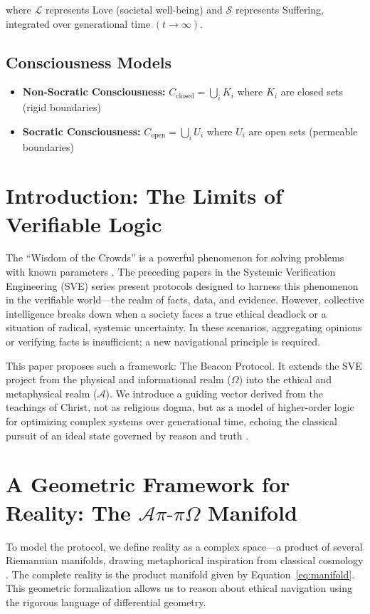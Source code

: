 \documentclass[11pt,a4paper]{article}
\begin{document}
\begin{small}
where $\mathcal{L}$ represents Love (societal well-being) and $\mathcal{S}$ represents Suffering, integrated over generational time $(t \to \infty)$.

\subsection*{Consciousness Models}
\begin{itemize}
    \item \textbf{Non-Socratic Consciousness:} $C_{\text{closed}} = \bigcup_{i} K_i$ where $K_i$ are closed sets (rigid boundaries)
    \item \textbf{Socratic Consciousness:} $C_{\text{open}} = \bigcup_{i} U_i$ where $U_i$ are open sets (permeable boundaries)
\end{itemize}

\vspace{0.5cm}
\clearpage
\setcounter{page}{1}

\section{Introduction: The Limits of Verifiable Logic}
The ``Wisdom of the Crowds'' is a powerful phenomenon for solving problems with known parameters \citep{surowiecki2004wisdom}. The preceding papers in the Systemic Verification Engineering (SVE) series present protocols designed to harness this phenomenon in the verifiable world—the realm of facts, data, and evidence. However, collective intelligence breaks down when a society faces a true ethical deadlock or a situation of radical, systemic uncertainty. In these scenarios, aggregating opinions or verifying facts is insufficient; a new navigational principle is required.

This paper proposes such a framework: The Beacon Protocol. It extends the SVE project from the physical and informational realm ($\Omega$) into the ethical and metaphysical realm ($\mathcal{A}$). We introduce a guiding vector derived from the teachings of Christ, not as religious dogma, but as a model of higher-order logic for optimizing complex systems over generational time, echoing the classical pursuit of an ideal state governed by reason and truth \citep{plato_republic}.

\section{A Geometric Framework for Reality: The \texorpdfstring{$\mathcal{A}\pi\text{-}\pi\Omega$}{Api-piOmega} Manifold}
To model the protocol, we define reality as a complex space—a product of several Riemannian manifolds, drawing metaphorical inspiration from classical cosmology \citep{old_testament}. The complete reality is the product manifold given by Equation~\eqref{eq:manifold}. This geometric formalization allows us to reason about ethical navigation using the rigorous language of differential geometry.


\end{small}
\end{document}
